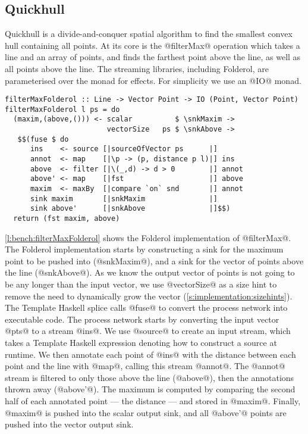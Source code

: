 \subsection{Quickhull}

Quickhull is a divide-and-conquer spatial algorithm to find the smallest convex hull containing all points.
At its core is the @filterMax@ operation which takes a line and an array of points, and finds the farthest point above the line, as well as all points above the line.
The streaming libraries, including Folderol, are parameterised over the monad for effects. For simplicity we use an @IO@ monad.

\begin{lstlisting}[float,label=l:bench:filterMaxFolderol,caption=Folderol implementation of filterMax]
filterMaxFolderol :: Line -> Vector Point -> IO (Point, Vector Point)
filterMaxFolderol l ps = do
  (maxim,(above,())) <- scalar          $ \snkMaxim ->
                        vectorSize   ps $ \snkAbove ->
   $$(fuse $ do
      ins    <- source [|sourceOfVector ps      |]
      annot  <- map    [|\p -> (p, distance p l)|] ins
      above  <- filter [|\(_,d) -> d > 0        |] annot
      above' <- map    [|fst                    |] above
      maxim  <- maxBy  [|compare `on` snd       |] annot
      sink maxim       [|snkMaxim               |]
      sink above'      [|snkAbove               |]$$)
  return (fst maxim, above)
\end{lstlisting}

\autoref{l:bench:filterMaxFolderol} shows the Folderol implementation of @filterMax@.
The Folderol implementation starts by constructing a sink for the maximum point to be pushed into (@snkMaxim@), and a sink for the vector of points above the line (@snkAbove@).
As we know the output vector of points is not going to be any longer than the input vector, we use @vectorSize@ as a size hint to remove the need to dynamically grow the vector (\autoref{s:implementation:sizehints}).
The Template Haskell splice calls @fuse@ to convert the process network into executable code.
The process network starts by converting the input vector @pts@ to a stream @ins@.
We use @source@ to create an input stream, which takes a Template Haskell expression denoting how to construct a source at runtime.
We then annotate each point of @ins@ with the distance between each point and the line with @map@, calling this stream @annot@.
The @annot@ stream is filtered to only those above the line (@above@), then the annotations thrown away (@above'@).
The maximum is computed by comparing the second half of each annotated point --- the distance --- and stored in @maxim@.
Finally, @maxim@ is pushed into the scalar output sink, and all @above'@ points are pushed into the vector output sink.


